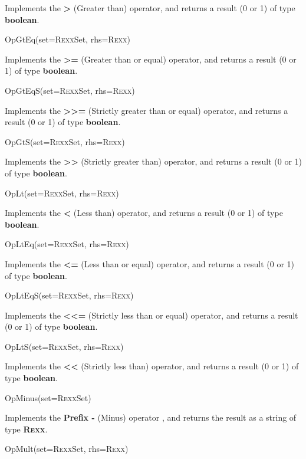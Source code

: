 \begin{description}
Implements the \nr{} \textbf{\textbf{>}} (Greater than)
operator, and returns a result (0 or 1) of type \textbf{boolean}.

\item{OpGtEq(set=R\textsc{exx}Set, rhs=R\textsc{exx})}

Implements the \nr{} \textbf{\textbf{>=}} (Greater than or equal)
operator, and returns a result (0 or 1) of type \textbf{boolean}.
\item{OpGtEqS(set=R\textsc{exx}Set, rhs=R\textsc{exx})}

Implements the \nr{} \textbf{\textbf{>>=}} (Strictly greater than
or equal) operator, and returns a result (0 or 1) of
type \textbf{boolean}.
\item{OpGtS(set=R\textsc{exx}Set, rhs=R\textsc{exx})}

Implements the \nr{} \textbf{\textbf{>>}} (Strictly greater than)
operator, and returns a result (0 or 1) of type \textbf{boolean}.
\item{OpLt(set=R\textsc{exx}Set, rhs=R\textsc{exx})}

Implements the \nr{} \textbf{\textbf{<}} (Less than)
operator, and returns a result (0 or 1) of type \textbf{boolean}.
\item{OpLtEq(set=R\textsc{exx}Set, rhs=R\textsc{exx})}

Implements the \nr{} \textbf{\textbf{<=}} (Less than or equal)
operator, and returns a result (0 or 1) of type \textbf{boolean}.
\item{OpLtEqS(set=R\textsc{exx}Set, rhs=R\textsc{exx})}

Implements the \nr{} \textbf{\textbf{<<=}} (Strictly less than
or equal) operator, and returns a result (0 or 1) of
type \textbf{boolean}.
\item{OpLtS(set=R\textsc{exx}Set, rhs=R\textsc{exx})}

Implements the \nr{} \textbf{\textbf{<<}} (Strictly less than)
operator, and returns a result (0 or 1) of type \textbf{boolean}.
\item{OpMinus(set=R\textsc{exx}Set)}

Implements the \nr{} \textbf{\textbf{Prefix -}} (Minus) operator
, and returns the result as a string of type \textbf{R\textsc{exx}}.
\item{OpMult(set=R\textsc{exx}Set, rhs=R\textsc{exx})}


\end{description}
